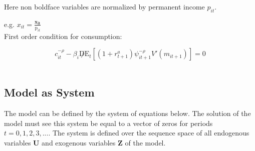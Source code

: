 \documentclass[titlepage]{\econtex}\providecommand{\texname}{BufferStockTheory}
\begin{document}
 Here non boldface variables are normalized by permanent income $\mathit{p_{it}}$. 

e.g. $x_{it} = \frac{\mathbf{x_{it}}}{\pmb{\mathrm{p}}_{it}}$ \\

First order condition for consumption:

$$c_{it}^{-\rho} -  \beta_{i} \not D \mathrm{E}_{t}\left[ (1+r^{a}_{t+1})  \psi_{it+1}^{-\rho} V'(m_{it+1})\right] = 0$$ \\ 












\hypertarget{Model as System}{}
\subsection{Model as System}

The model can be defined by the system of equations below. The solution of the model must see this system be equal to a vector of zeros for periods $t =0, 1, 2, 3, ...$. The system is defined over the sequence space of all endogenous variables $\mathbf{U}$  and exogenous variables $\mathbf{Z}$ of the model. \\
\end{document}
